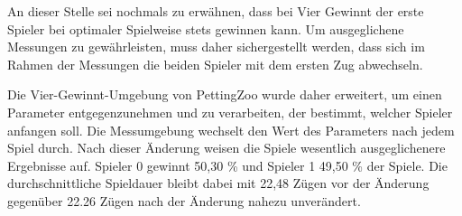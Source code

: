 An dieser Stelle sei nochmals zu erwähnen, dass bei Vier Gewinnt der erste Spieler bei optimaler Spielweise stets gewinnen kann. Um ausgeglichene Messungen zu gewährleisten, muss daher sichergestellt werden, dass sich im Rahmen der Messungen die beiden Spieler mit dem ersten Zug abwechseln.

Die Vier-Gewinnt-Umgebung von PettingZoo wurde daher erweitert, um einen Parameter entgegenzunehmen und zu verarbeiten, der bestimmt, welcher Spieler anfangen soll. Die Messumgebung wechselt den Wert des Parameters nach jedem Spiel durch. Nach dieser Änderung weisen die Spiele wesentlich ausgeglichenere Ergebnisse auf. Spieler 0 gewinnt 50,30 \% und Spieler 1 49,50 \% der Spiele. Die durchschnittliche Spieldauer bleibt dabei mit 22,48 Zügen vor der Änderung gegenüber 22.26 Zügen nach der Änderung nahezu unverändert.


\newpage